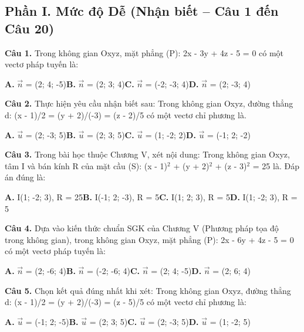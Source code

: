 \documentclass[11pt,a4paper]{article}
\begin{document}
\subsection*{\color{accent} Phần I. Mức độ Dễ (Nhận biết -- Câu 1 đến Câu 20)}
\textbf{\color{primary} Câu 1.} Trong không gian Oxyz, mặt phẳng (P): 2x - 3y + 4z - 5 = 0 có một vectơ pháp tuyến là:\par
\hspace*{1.5em}\textbf{A.} $\vec{n}$ = (2; 4; -5)\quad\quad \textbf{B.} $\vec{n}$ = (2; 3; 4)\quad\quad \textbf{C.} $\vec{n}$ = (-2; -3; 4)\quad\quad \textbf{D.} $\vec{n}$ = (2; -3; 4)\par\vspace{2pt}
\textbf{\color{primary} Câu 2.} Thực hiện yêu cầu nhận biết sau: Trong không gian Oxyz, đường thẳng d: (x - 1)/2 = (y + 2)/(-3) = (z - 2)/5 có một vectơ chỉ phương là.\par
\hspace*{1.5em}\textbf{A.} $\vec{u}$ = (2; -3; 5)\quad\quad \textbf{B.} $\vec{u}$ = (2; 3; 5)\quad\quad \textbf{C.} $\vec{u}$ = (1; -2; 2)\quad\quad \textbf{D.} $\vec{u}$ = (-1; 2; -2)\par\vspace{2pt}
\textbf{\color{primary} Câu 3.} Trong bài học thuộc Chương V, xét nội dung: Trong không gian Oxyz, tâm I và bán kính R của mặt cầu (S): (x - 1)$^2$ + (y + 2)$^2$ + (z - 3)$^2$ = 25 là. Đáp án đúng là:\par
\hspace*{1.5em}\textbf{A.} I(1; -2; 3), R = 25\quad\quad \textbf{B.} I(-1; 2; -3), R = 5\quad\quad \textbf{C.} I(1; 2; 3), R = 5\quad\quad \textbf{D.} I(1; -2; 3), R = 5\par\vspace{2pt}
\textbf{\color{primary} Câu 4.} Dựa vào kiến thức chuẩn SGK của Chương V (Phương pháp tọa độ trong không gian), trong không gian Oxyz, mặt phẳng (P): 2x - 6y + 4z - 5 = 0 có một vectơ pháp tuyến là:\par
\hspace*{1.5em}\textbf{A.} $\vec{n}$ = (2; -6; 4)\quad\quad \textbf{B.} $\vec{n}$ = (-2; -6; 4)\quad\quad \textbf{C.} $\vec{n}$ = (2; 4; -5)\quad\quad \textbf{D.} $\vec{n}$ = (2; 6; 4)\par\vspace{2pt}
\textbf{\color{primary} Câu 5.} Chọn kết quả đúng nhất khi xét: Trong không gian Oxyz, đường thẳng d: (x - 1)/2 = (y + 2)/(-3) = (z - 5)/5 có một vectơ chỉ phương là:\par
\hspace*{1.5em}\textbf{A.} $\vec{u}$ = (-1; 2; -5)\quad\quad \textbf{B.} $\vec{u}$ = (2; 3; 5)\quad\quad \textbf{C.} $\vec{u}$ = (2; -3; 5)\quad\quad \textbf{D.} $\vec{u}$ = (1; -2; 5)\par\vspace{2pt}
\end{document}
